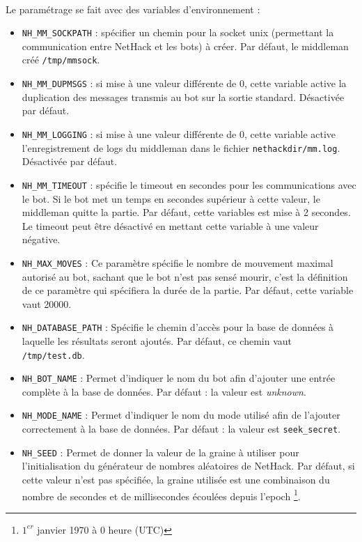 \documentclass[a4paper,12pt]{article}
\begin{document}
\paragraph{}Le paramétrage se fait avec des variables d'environnement :
\begin{itemize}
\item \verb!NH_MM_SOCKPATH! : spécifier un chemin pour la socket unix
	(permettant la communication entre NetHack et les bots) à créer. Par
	défaut, le middleman créé {\verb|/tmp/mmsock|}.
\item \verb!NH_MM_DUPMSGS! : si mise à une valeur différente de 0, cette
	variable active la duplication des messages transmis au bot sur la sortie
	standard. Désactivée par défaut.
\item \verb!NH_MM_LOGGING! : si mise à une valeur différente de 0, cette
	variable active l'enregistrement de logs du middleman dans le fichier
	{\verb|nethackdir/mm.log|}. Désactivée par défaut.
\item \verb!NH_MM_TIMEOUT! : spécifie le timeout en secondes pour les
	communications avec le bot. Si le bot met un temps en secondes supérieur à
	cette valeur, le middleman quitte la partie. Par défaut, cette variables
	est mise à 2 secondes. Le timeout peut être désactivé en mettant cette
	variable à une valeur négative.
\item \verb!NH_MAX_MOVES! :
  Ce paramètre spécifie le nombre de mouvement maximal autorisé au bot, sachant
  que le bot n'est pas sensé mourir, c'est la définition de ce paramètre qui
  spécifiera la durée de la partie. Par défaut, cette variable vaut 20000.
\item \verb!NH_DATABASE_PATH! :
  Spécifie le chemin d'accès pour la base de données à laquelle les résultats
  seront ajoutés. Par défaut, ce chemin vaut {\verb|/tmp/test.db|}.
\item \verb!NH_BOT_NAME! :
  Permet d'indiquer le nom du bot afin d'ajouter une entrée complète à la base
  de données. Par défaut : la valeur est \emph{unknown}.
\item \verb!NH_MODE_NAME! :
  Permet d'indiquer le nom du mode utilisé afin de l'ajouter correctement à la
  base de données. Par défaut : la valeur est {\verb|seek_secret|}.
\item \verb!NH_SEED! :
  Permet de donner la valeur de la graine à utiliser pour l'initialisation du
  générateur de nombres aléatoires de NetHack. Par défaut, si cette
  valeur n'est pas spécifiée, la graine utilisée est une combinaison du nombre
  de secondes et de millisecondes écoulées depuis l'epoch \footnote{$1^{er}$
  janvier 1970 à 0 heure (UTC)}.

\end{itemize}
\end{document}
